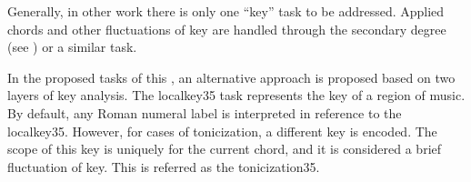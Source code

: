 
Generally, in other work \textcite{chen2018functional,
chen2019harmony, micchi2020not, micchi2021deep,
mcleod2021modular} there is only one ``key'' task to be
addressed. Applied chords and other fluctuations of key are
handled through the secondary degree (see
) or a similar task.

In the proposed tasks of this \thesisdiss{}, an alternative
approach is proposed based on two layers of key analysis.
The \gls{localkey35} task represents the key of a region of
music. By default, any Roman numeral label is interpreted in
reference to the \gls{localkey35}. However, for cases of
tonicization, a different key is encoded. The scope of this
key is uniquely for the current chord, and it is considered
a brief fluctuation of key. This is referred as the
\gls{tonicization35}.
